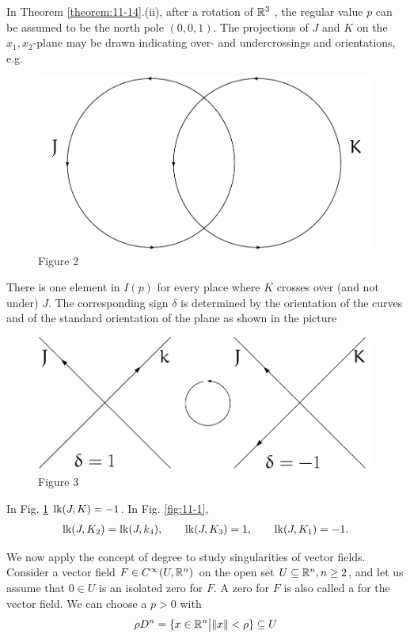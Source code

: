 \begin{remark}\label{remark:11-15}
  In Theorem \ref{theorem:11-14}.(ii), after a rotation of $\mathbb{R}^3$ , the regular value $p$
can be assumed to be the north pole $(0, 0, 1)$. The projections of $J$ and $K$ on the
$x_1, x_2$-plane may be drawn indicating over- and undercrossings and orientations, e.g.

\begin{figure}[!htb]
  \centering
  \includegraphics[width=.6\linewidth]{./pics/chap11-2-o.pdf}
  \caption{Figure 2}
  \label{fig:11-2}
\end{figure}

There is one element in $I(p)$ for every place where $K$ crosses over (and not under)
$J$. The corresponding sign $\delta$ is determined by the orientation of the curves and
of the standard orientation of the plane as shown in the picture

\begin{figure}[!htb]
  \centering
  \includegraphics[width=.6\linewidth]{./pics/chap11-3-o.pdf}
  \caption{Figure 3}
  \label{fig:11-3}
\end{figure}

In Fig. \ref{fig:11-2} $\mathrm{lk}(J, K) = -1$. In Fig. \ref{fig:11-1},
\begin{align}
  \mathrm{lk}(J, K_2) = \mathrm{lk}(J, k_4), \qquad \mathrm{lk}(J, K_3) = 1,\qquad \mathrm{lk}(J, K_1) = -1.
\end{align}
\end{remark}

We now apply the concept of degree to study singularities of vector fields.
Consider a vector field $F\in C^\infty(U, \mathbb{R}^n)$ on the open set $U\subseteq\mathbb{R}^n, n\ge 2$, 
and let us assume that $0\in U$ is an isolated zero for $F$. A zero for $F$ is also called a
 for the vector field. We can choose a $p > 0$ with
\begin{align*}
  \rho D^n = \{x\in\mathbb{R}^n\big| \|x\|<\rho\}\subseteq U
\end{align*}


